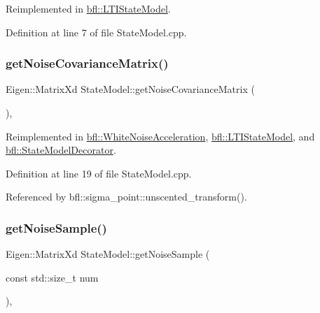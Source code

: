 Reimplemented in \mbox{\hyperlink{classbfl_1_1LTIStateModel_a5bdef1421c100bce7baa1961d2916fc3}{bfl\+::\+L\+T\+I\+State\+Model}}.



Definition at line 7 of file State\+Model.\+cpp.

\mbox{\label{classbfl_1_1StateModel_a423c1fa86b9d60c8663dedc6cdcae276}} 
\subsubsection{\texorpdfstring{get\+Noise\+Covariance\+Matrix()}{getNoiseCovarianceMatrix()}}
{\footnotesize\ttfamily Eigen\+::\+Matrix\+Xd State\+Model\+::get\+Noise\+Covariance\+Matrix (\begin{DoxyParamCaption}{ }\end{DoxyParamCaption})\hspace{0.3cm}{\ttfamily [virtual]}, {\ttfamily [inherited]}}



Reimplemented in \mbox{\hyperlink{classbfl_1_1WhiteNoiseAcceleration_a453df5960973059b35ee8686dc12ab0d}{bfl\+::\+White\+Noise\+Acceleration}}, \mbox{\hyperlink{classbfl_1_1LTIStateModel_a60a5ab5f3013b771ddd73787edd8dcde}{bfl\+::\+L\+T\+I\+State\+Model}}, and \mbox{\hyperlink{classbfl_1_1StateModelDecorator_ae70700c1fad6b788b21722e57f2d0f6b}{bfl\+::\+State\+Model\+Decorator}}.



Definition at line 19 of file State\+Model.\+cpp.



Referenced by bfl\+::sigma\+\_\+point\+::unscented\+\_\+transform().

\mbox{\label{classbfl_1_1StateModel_acc6733af2dcba2a330bf7c59c3725e42}} 
\subsubsection{\texorpdfstring{get\+Noise\+Sample()}{getNoiseSample()}}
{\footnotesize\ttfamily Eigen\+::\+Matrix\+Xd State\+Model\+::get\+Noise\+Sample (\begin{DoxyParamCaption}\item[{const std\+::size\+\_\+t}]{num }\end{DoxyParamCaption})\hspace{0.3cm}{\ttfamily [virtual]}, {\ttfamily [inherited]}}



